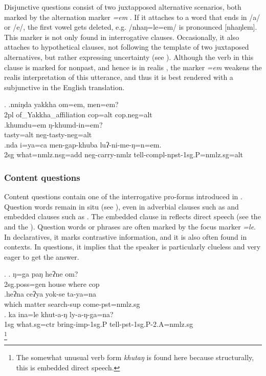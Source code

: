  Disjunctive questions consist of two juxtapposed alternative scenarios, both marked by the alternation marker \emph{=em} \Next. If it attaches to a word that ends in /a/ or /e/, the first vowel gets deleted, e.g. /nhaŋ=le=em/  is pronounced	[nhaŋlem]. This marker is not only found in interrogative clauses. Occasionally, it also attaches to hypothetical clauses, not following the template of two juxtaposed alternatives, but rather expressing uncertainty (see \Next[c]). Although the verb in this clause is marked for nonpast, and hence is in realis , the marker \emph{=em} weakens the realis interpretation of this utterance, and thus it is best rendered with a subjunctive in the English translation.
 
 \ex. \ag.nniŋda yakkha          om=em,    men=em?\\
 {\sc 2pl} of\_Yakkha\_affiliation {\sc cop=alt} {\sc cop.neg=alt}\\
  
 \bg.khumdu=em ŋ-khumd-in=em?\\
 tasty{\sc =alt} {\sc neg-}tasty{\sc -neg=alt}\\
 \bg.nda i=ya=ca men-gap-khuba luʔ-ni-me-ŋ=n=em.\\
 {\sc 2sg} what{\sc =nmlz.nsg=add} {\sc neg-}carry{\sc -nmlz} tell{\sc -compl-npst-1sg.P=nmlz.sg=alt}\\
  
 
\subsubsection{Content questions}

Content questions contain one of the interrogative pro-forms introduced in . Question words remain in situ (see \Next[a]), even in adverbial clauses such as \Next[b] and embedded clauses such as \Next[c]. The embedded clause in \Next[c] reflects direct speech (see the  and the ). Question words or phrases are often marked by the focus marker \emph{=le}. In declaratives, it marks contrastive information,  and it is also often found in  contexts. In questions, it implies that the speaker is particularly clueless and very eager to get the answer.

\ex. \ag. ŋ=ga          paŋ  heʔne om?\\
{\sc 2sg.poss=gen} house where {\sc cop}\\
 
\bg.heʔna ceʔya yok-se ta-ya=na\\
which  matter search{\sc -sup} come{\sc [3sg]-pst=nmlz.sg}\\
\bg. ka ina=le khut-a-ŋ ly-a-ŋ-ga=na?\\
{\sc 1sg} what{\sc .sg=ctr} bring{\sc -imp-1sg.P} tell{\sc -pst-1sg.P-2.A=nmlz.sg}\\
\footnote{The somewhat unusual verb form \emph{khutaŋ}  is found here because structurally, this is embedded direct speech.}



